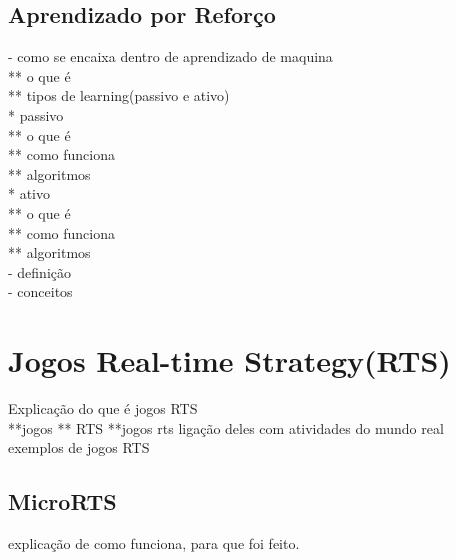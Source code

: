 \subsection{Aprendizado por Reforço} 
- como se encaixa dentro de aprendizado de maquina \\
** o que é \\
** tipos de learning(passivo e ativo) \\
* passivo \\
** o que é \\
** como funciona \\
** algoritmos \\
* ativo \\
** o que é \\
** como funciona \\
** algoritmos \\

- definição \\
- conceitos 

\section{Jogos Real-time Strategy(RTS)} 
Explicação do que é jogos RTS \\
**jogos
** RTS
**jogos rts
ligação deles com atividades do mundo real \\
exemplos de jogos RTS 

\subsection{MicroRTS} 
explicação de como funciona, para que foi feito. 
